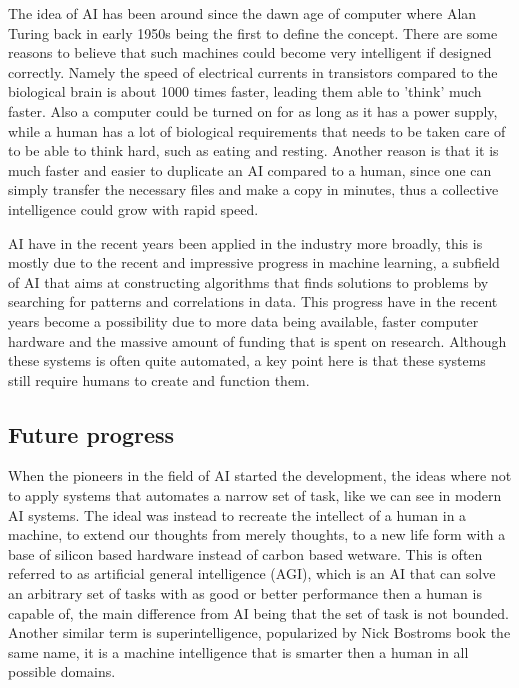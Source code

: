 \documentclass[12pt,A4]{report}
\theoremstyle{definition}
\begin{document}
The idea of AI has been around since the dawn age of computer where Alan Turing back in early 1950s being the first to define the concept. There are some reasons to believe that such machines could become very intelligent if designed correctly. Namely the speed of electrical currents in transistors compared to the biological brain is about 1000 times faster, leading them able to 'think' much faster. Also a computer could be turned on for as long as it has a power supply, while a human has a lot of biological requirements that needs to be taken care of to be able to think hard, such as eating and resting. Another reason is that it is much faster and easier to duplicate an AI compared to a human, since one can simply transfer the necessary files and make a copy in minutes, thus a collective intelligence could grow with rapid speed.

AI have in the recent years been applied in the industry more broadly, this is mostly due to the recent and impressive progress in machine learning, a subfield of AI that aims at constructing algorithms that finds solutions to problems by searching for patterns and correlations in data. This progress have in the recent years become a possibility due to more data being available, faster computer hardware and the massive amount of funding that is spent on research. Although these systems is often quite automated, a key point here is that these systems still require humans to create and function them.


\subsection{Future progress}
When the pioneers in the field of AI started the development, the ideas where not to apply systems that automates a narrow set of task, like we can see in modern AI systems. The ideal was instead to recreate the intellect of a human in a machine, to extend our thoughts from merely thoughts, to a new life form with a base of silicon based hardware instead of carbon based wetware. This is often referred to as artificial general intelligence (AGI), which is an AI that can solve an arbitrary set of tasks with as good or better performance then a human is capable of, the main difference from AI being that the set of task is not bounded. Another similar term is  superintelligence, popularized by Nick Bostroms book the same name, it is a machine intelligence that is smarter then a human in all possible domains.
\end{document}
